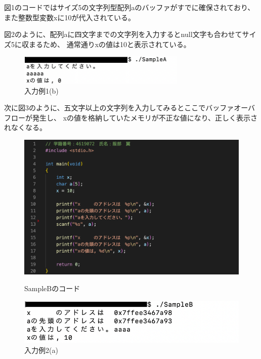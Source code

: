 \documentclass[12pt]{jarticle}
\begin{document}
図1のコードではサイズ5の文字列型配列aのバッファがすでに確保されており、
また整数型変数xに10が代入されている。

図2のように、配列aに四文字までの文字列を入力するとnull文字も合わせてサイズ5に収まるため、
通常通りxの値は10と表示されている。\\

\begin{figure}[h]
    \begin{center}
        \includegraphics[width=8cm]{A_5.png}
        \caption{入力例1(b)}
        \label{ラベル}
    \end{center}
\end{figure}

次に図3のように、五文字以上の文字列を入力してみるとここでバッファオーバフローが発生し、
xの値を格納していたメモリが不正な値になり、正しく表示されなくなる。\\

\begin{figure}[h]
    \begin{minipage}[t]{0.5\columnwidth}
        \begin{center}
            \includegraphics[clip, width=0.9\columnwidth]{SampleB.png}
        \end{center}
        \caption{SampleBのコード}
        \label{fig:left}
    \end{minipage}%
    \begin{minipage}[t]{0.5\columnwidth}
        \begin{center}
            \includegraphics[clip, width=0.9\columnwidth]{B_4.png}
        \end{center}
        \caption{入力例2(a)}
        \label{fig:right}
    \end{minipage}
\end{figure}
\end{document}
